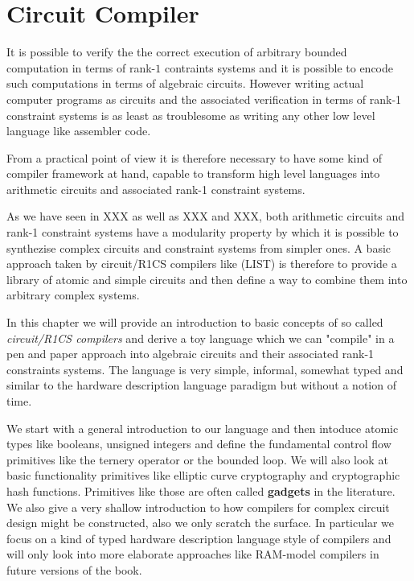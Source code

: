 \chapter{Circuit Compiler} 
It is possible to verify the the correct execution of arbitrary bounded computation in terms of rank-$1$ contraints systems and it is possible to encode such computations in terms of algebraic circuits. However writing actual computer programs as circuits and the associated verification in terms of rank-1 constraint systems is as least as troublesome as writing any other low level language like assembler code. 

From a practical point of view it is therefore necessary to have some kind of compiler framework at hand, capable to transform high level languages into arithmetic circuits and associated rank-1 constraint systems. 

As we have seen in XXX as well as XXX and XXX, both arithmetic circuits and rank-1 constraint systems have a modularity property by which it is possible to synthezise  complex circuits and constraint systems from simpler ones. A basic approach taken by circuit/R1CS compilers like (LIST) is therefore to provide a library of atomic and simple circuits and then define a way to combine them into arbitrary complex systems. 

In this chapter we will provide an introduction to basic concepts of so called \textit{circuit/R1CS compilers} and derive a toy language which we can "compile" in a pen and paper approach into algebraic circuits and their associated rank-1 constraints systems. The language is very simple, informal, somewhat typed and similar to the hardware description language paradigm but without a notion of time. 

We start with a general introduction to our language and then intoduce atomic types like booleans, unsigned integers and define the fundamental control flow primitives like the ternery operator or the bounded loop. We will also look at basic functionality primitives like elliptic curve cryptography and cryptographic hash functions. Primitives like those are often called \textbf{gadgets} in the literature. We also give a very shallow introduction to how compilers for complex circuit design might be constructed, also we only scratch the surface. In particular we focus on a kind of typed hardware description language style of compilers and will only look into more elaborate approaches like RAM-model compilers in future versions of the book.

